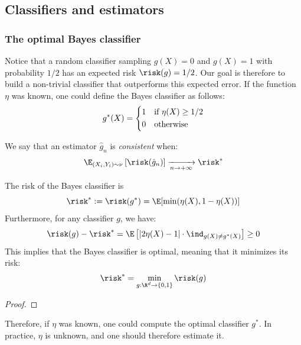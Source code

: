 \documentclass[toc, titlepaged]{../cs-classes/cs-classes}
\begin{document}
\subsection{Classifiers and estimators}
\subsubsection{The optimal Bayes classifier}
Notice that a random classifier sampling $g(X)=0$ and $g(X)=1$ with probability $1/2$ has an expected risk $\risk(g)=1/2$. Our goal is therefore to build a non-trivial classifier that outperforms this expected error. If the function $\eta$ was known, one could define the Bayes classifier as follows:
\begin{equation*}
    g^*(X) = \begin{cases*}
        1 & if $\eta(X)\geq1/2$\\
        0 & otherwise
    \end{cases*}
\end{equation*}

\begin{definition}[Consistency]
    We say that an estimator $\hat{g}_n$ is \emph{consistent} when:
    \begin{equation*}
        \E_{(X_i, Y_i)\sim\nu}\left[\risk(\hat{g}_n)\right] \xrightarrow[n\to+\infty]{}\risk^*
    \end{equation*}
\end{definition}

\begin{lemma}
    The risk of the Bayes classifier is
    \begin{equation*}
        \risk^* := \risk(g^*) = \E[\min(\eta(X), 1-\eta(X))]
    \end{equation*}
    Furthermore, for any classifier $g$, we have:
    \begin{equation*}
        \risk(g)-\risk^* = \E\left[|2\eta(X)-1|\cdot\ind_{g(X)\neq g^*(X)}\right] \geq 0
    \end{equation*}
    This implies that the Bayes classifier is optimal, meaning that it minimizes its risk:
    \begin{equation*}
        \risk^* = \min_{g:\R^d\to\{0, 1\}}\risk(g)
    \end{equation*}
\end{lemma}
\begin{proof}
\end{proof}

Therefore, if $\eta$ was known, one could compute the optimal classifier $g^*$. In practice, $\eta$ is unknown, and one should therefore estimate it.
\end{document}
